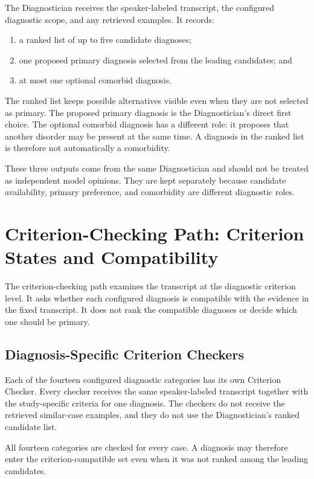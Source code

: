 The Diagnostician receives the speaker-labeled transcript, the configured diagnostic scope, and any retrieved examples. It records:

\begin{enumerate}
    \item a ranked list of up to five candidate diagnoses;
    \item one proposed primary diagnosis selected from the leading candidates; and
    \item at most one optional comorbid diagnosis.
\end{enumerate}

The ranked list keeps possible alternatives visible even when they are not selected as primary. The proposed primary diagnosis is the Diagnostician's direct first choice. The optional comorbid diagnosis has a different role: it proposes that another disorder may be present at the same time. A diagnosis in the ranked list is therefore not automatically a comorbidity.

These three outputs come from the same Diagnostician and should not be treated as independent model opinions. They are kept separately because candidate availability, primary preference, and comorbidity are different diagnostic roles.

\section{Criterion-Checking Path: Criterion States and Compatibility}
\label{sec:criterion-checking-path}

The criterion-checking path examines the transcript at the diagnostic criterion level. It asks whether each configured diagnosis is compatible with the evidence in the fixed transcript. It does not rank the compatible diagnoses or decide which one should be primary.

\subsection{Diagnosis-Specific Criterion Checkers}
\label{sec:criterion-checkers}

Each of the fourteen configured diagnostic categories has its own Criterion Checker. Every checker receives the same speaker-labeled transcript together with the study-specific criteria for one diagnosis. The checkers do not receive the retrieved similar-case examples, and they do not use the Diagnostician's ranked candidate list.

All fourteen categories are checked for every case. A diagnosis may therefore enter the criterion-compatible set even when it was not ranked among the leading candidates.


